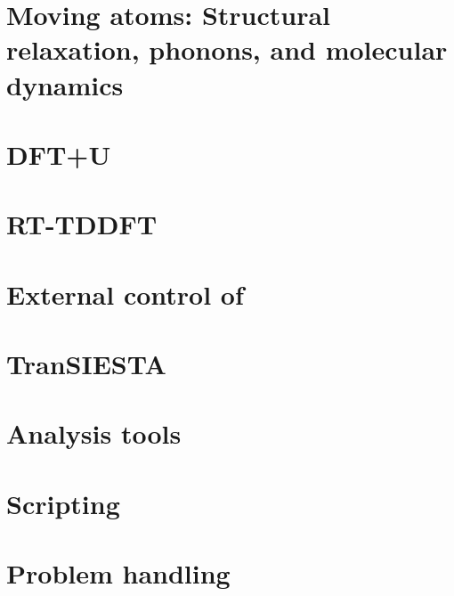 \vspace{5pt}
\section{Moving atoms: Structural relaxation, phonons, and molecular dynamics}



\section{DFT+U}



\section{RT-TDDFT}\label{sec:tddft}



\section{External control of \texorpdfstring{\siesta}{SIESTA}}



\section{TranSIESTA}
\label{sec:transiesta}



\section{Analysis tools}



\section{Scripting}



\section{Problem handling}



